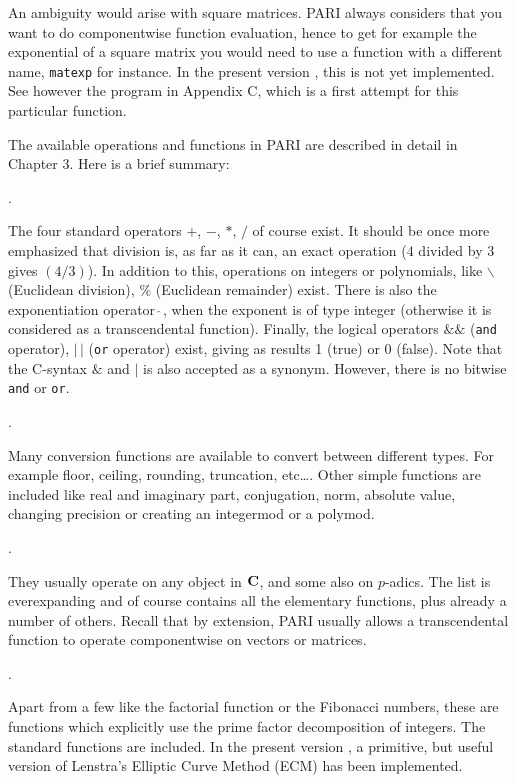An ambiguity would arise with square matrices. PARI always considers
that you want to do componentwise function evaluation, hence to get
for example the exponential of a square matrix you would need to use
a function with a different name, {\tt matexp} for instance. In the present
version \vers, this is not yet implemented. See however the program in
Appendix C, which is a first attempt for this particular function.

The available operations and functions in PARI are described in detail
in Chapter 3. Here is a brief summary:

.

The four standard operators $+$, $-$, $*$, $/$ of course exist. It should
be once more emphasized that division is, as far as it can, an exact
operation ($4$ divided by $3$ gives $(4/3)$). In addition to this, operations
on integers or polynomials, like $\backslash $ (Euclidean division),
$\%$ (Euclidean remainder) exist. There is also the exponentiation
operator $\hat{\ }$, when the exponent is of type integer
(otherwise it is considered as a transcendental function).
Finally, the logical operators $\&\&$ ({\tt and} operator), $|\,|$ ({\tt or}
operator) exist, giving as results 1 (true) or 0 (false). Note that the
C-syntax $\&$ and $|$ is also accepted as a synonym. However, there is
no bitwise {\tt and} or {\tt or}.

.

Many conversion functions are available to convert between different
types. For example floor, ceiling, rounding, truncation, etc\dots.
Other simple functions are included like real and imaginary part,
conjugation,
norm, absolute value, changing precision or creating an integermod or a
polymod.

.

They usually operate on any object in $\Bbb C$, and some also on $p$-adics.
The list is everexpanding and of course contains all the elementary
functions, plus already a number of others. Recall that by extension,
PARI usually allows a transcendental function to operate componentwise
on vectors or matrices.

.

Apart from a few like the factorial function or the Fibonacci
numbers, these are functions which explicitly use the prime factor
decomposition of integers. The standard functions are included.
In the present version \vers, a primitive, but useful version of Lenstra's
Elliptic Curve Method (ECM) has been implemented.

